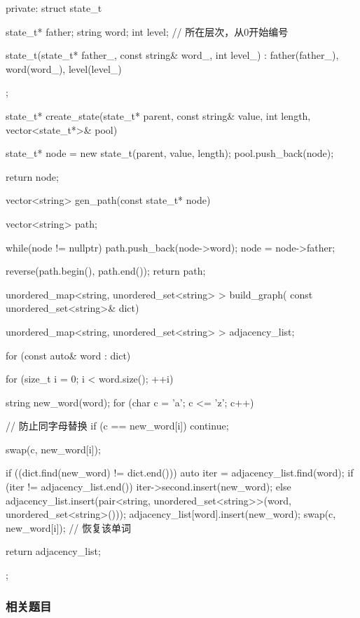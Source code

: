\begin{Code}
{private:
    struct state_t {
        state_t* father;
        string word;
        int level; // 所在层次，从0开始编号

        state_t(state_t* father_, const string& word_, int level_) :
            father(father_), word(word_), level(level_) {}
    };

    state_t* create_state(state_t* parent, const string& value,
            int length, vector<state_t*>& pool) {
        state_t* node = new state_t(parent, value, length);
        pool.push_back(node);

        return node;
    }
    vector<string> gen_path(const state_t* node) {
        vector<string> path;

        while(node != nullptr) {
            path.push_back(node->word);
            node = node->father;
        }

        reverse(path.begin(), path.end());
        return path;
    }

    unordered_map<string, unordered_set<string> > build_graph(
            const unordered_set<string>& dict) {
        unordered_map<string, unordered_set<string> > adjacency_list;

        for (const auto& word : dict) {
            for (size_t i = 0; i < word.size(); ++i) {
                string new_word(word);
                for (char c = 'a'; c <= 'z'; c++) {
                    // 防止同字母替换
                    if (c == new_word[i]) continue;

                    swap(c, new_word[i]);

                    if ((dict.find(new_word) != dict.end())) {
                        auto iter = adjacency_list.find(word);
                        if (iter != adjacency_list.end()) {
                            iter->second.insert(new_word);
                        } else {
                            adjacency_list.insert(pair<string,
                                unordered_set<string>>(word, unordered_set<string>()));
                            adjacency_list[word].insert(new_word);
                        }
                    }
                    swap(c, new_word[i]); // 恢复该单词
                }
            }
        }
        return adjacency_list;
    }
};
\end{Code}


\subsubsection{相关题目}

